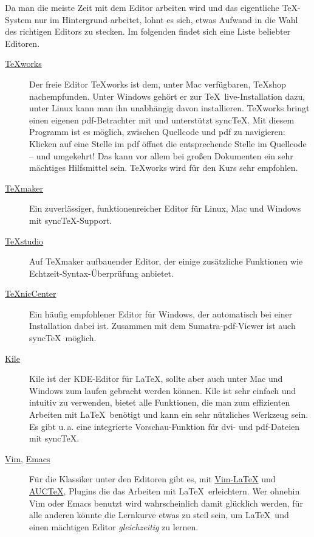 \documentclass[
	vorläufig=false, 
	datum=2021-10-20,
	titel=Installationshinweise,
]{../tex/latexkurs-exercise}
\begin{document}
Da man die meiste Zeit mit dem Editor arbeiten wird und das eigentliche \TeX-System nur im Hintergrund arbeitet, lohnt es sich, etwas Aufwand in die Wahl des richtigen Editors zu stecken. Im folgenden findet sich eine Liste beliebter Editoren.

\begin{description}
\item[\href{http://www.tug.org/texworks/}{\TeX works}]
Der freie Editor {\TeX works} ist dem, unter Mac verfügbaren, \TeX shop nachempfunden. Unter Windows gehört er zur \TeX\ live-Installation dazu, unter Linux kann man ihn unabhängig davon installieren. \TeX works bringt einen eigenen pdf-Betrachter mit und unterstützt sync\TeX. Mit diesem Programm ist es möglich, zwischen Quellcode und pdf zu navigieren: Klicken auf eine Stelle im pdf öffnet die entsprechende Stelle im Quellcode – und umgekehrt! Das kann vor allem bei großen Dokumenten ein sehr mächtiges Hilfsmittel sein. \TeX works wird für den Kurs sehr empfohlen.

\item[\href{http://www.xm1math.net/texmaker/}{TeXmaker}]
Ein zuverlässiger, funktionenreicher Editor für Linux, Mac und Windows mit sync\TeX-Support.

\item[\href{http://texstudio.sourceforge.net/}{\TeX studio}]
Auf TeXmaker aufbauender Editor, der einige zusätzliche Funktionen wie Echtzeit-Syntax-Überprüfung anbietet.

\item[\href{http://www.texniccenter.org/}{\TeX nicCenter}]
Ein häufig empfohlener Editor für Windows, der automatisch bei einer \-Installation dabei ist. Zusammen mit dem Sumatra-pdf-Viewer ist auch sync\TeX\ möglich.

\item[\href{http://kile.sourceforge.net/}{Kile}]
Kile ist der KDE-Editor für \LaTeX, sollte aber auch unter Mac und Windows zum laufen gebracht werden können. Kile ist sehr einfach und intuitiv zu verwenden, bietet alle Funktionen, die man zum effizienten Arbeiten mit \LaTeX\ benötigt und kann ein sehr nützliches Werkzeug sein. Es gibt u.\,a. eine integrierte Vorschau-Funktion für dvi- und pdf-Dateien mit sync\TeX.

\item[\href{http://www.vim.org/}{Vim}, \href{http://www.gnu.org/software/emacs}{Emacs}]
Für die Klassiker unter den Editoren gibt es, mit \href{http://vim-latex.sourceforge.net/}{Vim-LaTeX} und \href{http://www.gnu.org/software/auctex/}{AUC\TeX}, Plugins die das Arbeiten mit \LaTeX\ erleichtern. Wer ohnehin Vim oder Emacs benutzt wird wahrscheinlich damit glücklich werden, für alle anderen könnte die Lernkurve etwas zu steil sein, um \LaTeX\ und einen mächtigen Editor \emph{gleichzeitig} zu lernen.


\end{description}
\end{document}
